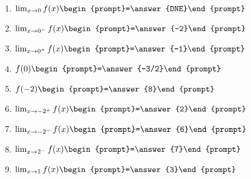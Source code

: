 \documentclass{ximera}
\begin{document}
\begin{question}
\begin{enumerate}
\item $\lim_{x\to 0} f(x) \begin{prompt}=\answer{DNE}\end{prompt}$
\item $\lim_{x\to 0^-} f(x) \begin{prompt}=\answer{-2}\end{prompt}$
\item $\lim_{x\to 0^+} f(x) \begin{prompt}=\answer{-1}\end{prompt}$
\item $f(0) \begin{prompt}=\answer{-3/2}\end{prompt}$
\item $f(-2) \begin{prompt}=\answer{8}\end{prompt}$
\item $\lim_{x\to -2^+} f(x) \begin{prompt}=\answer{2}\end{prompt}$
\item $\lim_{x\to -2^-} f(x) \begin{prompt}=\answer{6}\end{prompt}$
\item $\lim_{x\to 2^-} f(x) \begin{prompt}=\answer{7}\end{prompt}$
\item $\lim_{x\to 1} f(x) \begin{prompt}=\answer{3}\end{prompt}$

\end{enumerate}
\end{question}
\end{document}
